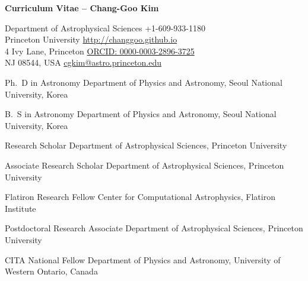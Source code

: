 \documentclass[12pt]{article}
\begin{document}
\begin{center}
{\large \bf Curriculum Vitae -- Chang-Goo Kim}
\end{center}
Department of Astrophysical Sciences
\hfill +1-609-933-1180\\
Princeton University
\hfill \url{http://changgoo.github.io}\\
4 Ivy Lane, Princeton
\hfill \href{http://orcid.org/0000-0003-2896-3725}{ORCID: 0000-0003-2896-3725}\\
NJ 08544, USA
\hfill \url{cgkim@astro.princeton.edu}



{Ph.~D in Astronomy}
{Department of Physics and Astronomy, Seoul National University, Korea}

{B.~S in Astronomy}
{Department of Physics and Astronomy, Seoul National University, Korea}



{Research Scholar}
{Department of Astrophysical Sciences, Princeton University}



{Associate Research Scholar}
{Department of Astrophysical Sciences, Princeton University}

{Flatiron Research Fellow}
{Center for Computational Astrophysics, Flatiron Institute}

{Postdoctoral Research Associate}
{Department of Astrophysical Sciences, Princeton University}

{CITA National Fellow}
{Department of Physics and Astronomy, University of Western Ontario, Canada}
\end{document}
